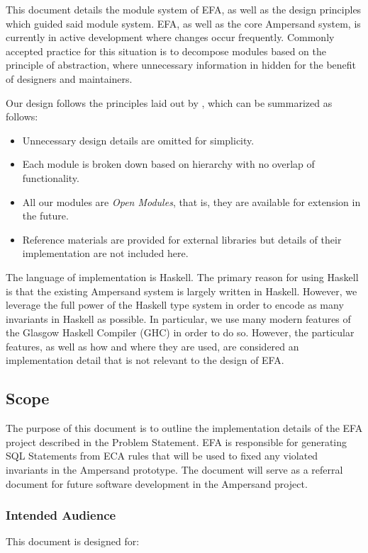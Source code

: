 \documentclass[12pt, svgnames]{article}
\let\Oldsubsection\subsection
\renewcommand{\subsection}{\FloatBarrier\Oldsubsection}
\let\Oldsubsubsection\subsubsection
\renewcommand{\subsubsection}{\FloatBarrier\Oldsubsubsection}
\begin{document}
This document details the module system of EFA, as well as the design principles
which guided said module system. EFA, as well as the core Ampersand system, is
currently in active development where changes occur frequently. Commonly
accepted practice for this situation is to decompose modules based on the
principle of abstraction, where unnecessary information in hidden for the
benefit of designers and maintainers\citep{modStruct,Parnas1972}.

Our design follows the principles laid out by \citep{modStruct}, which can be summarized as follows:
\begin{itemize}
\item Unnecessary design details are omitted for simplicity.
\item Each module is broken down based on hierarchy with no overlap of functionality.
\item All our modules are \emph{Open Modules}, that is, they are available for extension in the future.
\item Reference materials are provided for external libraries but details of
  their implementation are not included here. 
\end{itemize}

The language of implementation is Haskell. The primary reason for using Haskell
is that the existing Ampersand system is largely written in Haskell. However, we
leverage the full power of the Haskell type system in order to encode as many
invariants in Haskell as possible. In particular, we use many modern features of
the Glasgow Haskell Compiler (GHC) in order to do so. However, the particular
features, as well as how and where they are used, are considered an
implementation detail that is not relevant to the design of EFA.

\subsection{Scope}
The purpose of this document is to outline the implementation details of the 
EFA project described in the Problem Statement.
EFA is responsible for generating SQL Statements from ECA rules that will 
be used to fixed any violated invariants in the Ampersand prototype. 
The document will serve as a referral document for future software development in the Ampersand project.

\subsubsection{Intended Audience}
This document is designed for:
\end{document}
